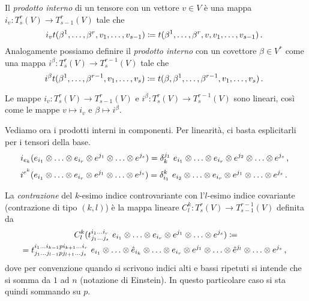 \begin{definition}  \label{def:ProdottoInternoTensore}
	Il \emph{prodotto interno} di un tensore con un vettore $v\in V$  è una mappa $i_v:T_s^r(V)\to T_{s-1}^r(V)$ tale che
	\begin{equation*}
		i_vt(\beta^1,\ldots,\beta^r,v_1,\ldots,v_{s-1}) \coloneqq t(\beta^1,\ldots,\beta^r,v,v_1,\ldots,v_{s-1})\, \text{. }
	\end{equation*}
	Analogamente possiamo definire il \emph{prodotto interno} con un covettore $\beta \in V^*$ come una mappa $i^\beta:T_s^r(V)\to T_{s}^{r-1}(V)$ tale che
	\begin{equation*}
		i^\beta t(\beta^1,\ldots,\beta^{r-1},v_1,\ldots,v_s) \coloneqq t(\beta,\beta^1,\ldots,\beta^{r-1},v_1,\ldots,v_s)\, \text{. }
	\end{equation*}
\end{definition}

\begin{remark}
	Le mappe $i_v:T_s^r(V)\to T_{s-1}^r(V)$ e $i^\beta:T_s^r(V)\to T_s^{r-1}(V)$ sono lineari, così come le mappe $v\mapsto i_v$ e $\beta\mapsto i^\beta$.
\end{remark}

Vediamo ora i prodotti interni in componenti. Per linearità, ci basta esplicitarli per i tensori della base.
\begin{equation*}
	i_{e_k} (e_{i_1}\otimes \ldots \otimes e_{i_r}\otimes e^{j_1}\otimes \ldots\otimes e^{j_s}) = \delta_k^{j_1}\ e_{i_1}\otimes \ldots \otimes e_{i_r}\otimes e^{j_2}\otimes \ldots\otimes e^{j_s}\virgola
\end{equation*}
\begin{equation*}
	i^{e^k} (e_{i_1}\otimes \ldots \otimes e_{i_r}\otimes e^{j_1}\otimes \ldots\otimes e^{j_s}) = \delta_{i_1}^k\ e_{i_2}\otimes \ldots \otimes e_{i_r}\otimes e^{j_1}\otimes \ldots\otimes e^{j_s}\punto
\end{equation*}

\begin{definition} 
	La \emph{contrazione} del $k$-esimo indice controvariante con l'$l$-esimo indice covariante (contrazione di tipo $(k,l)$) è la mappa lineare $C_l^k:T_s^r(V)\to T_{s-1}^{r-1}(V)$ definita da 
	\begin{multline*}
		C_l^k(t_{j_1\ldots j_s}^{i_1\ldots i_r}\ e_{i_1}\otimes \ldots \otimes e_{i_r}\otimes e^{j_1}\otimes \ldots\otimes e^{j_s}) \coloneqq\\
		=t_{j_1\ldots j_{l-1}pj_{l+1}\ldots j_s}^{i_1\ldots i_{k-1}pi_{k+1}\ldots i_r}\ e_{i_1}\otimes \ldots \otimes\hat e_{i_k}\otimes \ldots\otimes e_{i_r}\otimes e^{j_1}\otimes \ldots\otimes \hat e^{j_l}\otimes \ldots \otimes e^{j_s} \, \text{, }
	\end{multline*}
	dove per convenzione quando si scrivono indici alti e bassi ripetuti si intende che si somma da $1$ ad $n$ (notazione di Einstein). In questo particolare caso si sta quindi sommando su $p$.
\end{definition}


